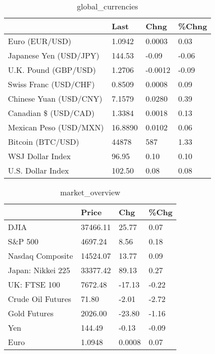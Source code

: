 \documentclass{article}%
\begin{document}
%


\begin{table}[htbp]%
\caption{global\_currencies}%
\centering%
\begin{adjustbox}{width=1\textwidth}%
\begin{tabular}{llll}
\toprule
                       &    Last &    Chng & \%Chng \\
\midrule
        Euro (EUR/USD) &  1.0942 &  0.0003 &  0.03 \\
Japanese Yen (USD/JPY) &  144.53 &   -0.09 & -0.06 \\
  U.K. Pound (GBP/USD) &  1.2706 & -0.0012 & -0.09 \\
 Swiss Franc (USD/CHF) &  0.8509 &  0.0008 &  0.09 \\
Chinese Yuan (USD/CNY) &  7.1579 &  0.0280 &  0.39 \\
  Canadian \$ (USD/CAD) &  1.3384 &  0.0018 &  0.13 \\
Mexican Peso (USD/MXN) & 16.8890 &  0.0102 &  0.06 \\
     Bitcoin (BTC/USD) &   44878 &     587 &  1.33 \\
      WSJ Dollar Index &   96.95 &    0.10 &  0.10 \\
     U.S. Dollar Index &  102.50 &    0.08 &  0.08 \\
\bottomrule
\end{tabular}
%
\end{adjustbox}%
\end{table}

%


\begin{table}[htbp]%
\caption{market\_overview}%
\centering%
\begin{adjustbox}{width=1\textwidth}%
\begin{tabular}{llll}
\toprule
                  &    Price &    Chg &  \%Chg \\
\midrule
             DJIA & 37466.11 &  25.77 &  0.07 \\
          S\&P 500 &  4697.24 &   8.56 &  0.18 \\
 Nasdaq Composite & 14524.07 &  13.77 &  0.09 \\
Japan: Nikkei 225 & 33377.42 &  89.13 &  0.27 \\
     UK: FTSE 100 &  7672.48 & -17.13 & -0.22 \\
Crude Oil Futures &    71.80 &  -2.01 & -2.72 \\
     Gold Futures &  2026.00 & -23.80 & -1.16 \\
              Yen &   144.49 &  -0.13 & -0.09 \\
             Euro &   1.0948 & 0.0008 &  0.07 \\
\bottomrule
\end{tabular}
%
\end{adjustbox}%
\end{table}

%
\end{document}
